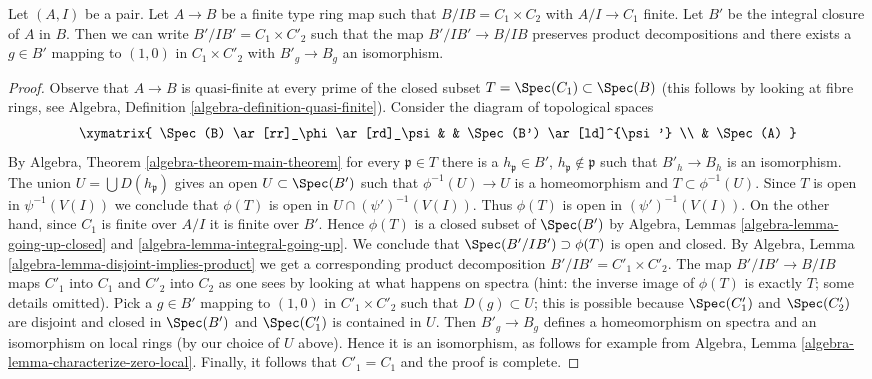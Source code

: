 \begin{lemma}
\label{lemma-helper-finite-type}
Let $(A, I)$ be a pair. Let $A \to B$ be a finite type ring map
such that $B/IB = C_1 \times C_2$ with $A/I \to C_1$ finite.
Let $B'$ be the integral closure of $A$ in $B$.
Then we can write $B'/IB' = C_1 \times C'_2$ such that
the map $B'/IB' \to B/IB$ preserves product decompositions
and there exists a $g \in B'$ mapping to $(1, 0)$ in
$C_1 \times C'_2$ with $B'_g \to B_g$ an isomorphism.
\end{lemma}

\begin{proof}
Observe that $A \to B$ is quasi-finite at every prime of the
closed subset $T = \Spec(C_1) \subset \Spec(B)$ (this follows
by looking at fibre rings, see
Algebra, Definition \ref{algebra-definition-quasi-finite}).
Consider the diagram of topological spaces
$$
\xymatrix{
\Spec(B) \ar[rr]_\phi \ar[rd]_\psi & & \Spec(B') \ar[ld]^{\psi'} \\
& \Spec(A)
}
$$
By Algebra, Theorem \ref{algebra-theorem-main-theorem}
for every $\mathfrak p \in T$ there is a $h_\mathfrak p \in B'$,
$h_\mathfrak p \not \in \mathfrak p$ such that $B'_h \to B_h$ is
an isomorphism. The union $U = \bigcup D(h_\mathfrak p)$ gives an open
$U \subset \Spec(B')$ such that $\phi^{-1}(U) \to U$ is a homeomorphism
and $T \subset \phi^{-1}(U)$. Since $T$ is open in $\psi^{-1}(V(I))$
we conclude that $\phi(T)$ is open in $U \cap (\psi')^{-1}(V(I))$.
Thus $\phi(T)$ is open in $(\psi')^{-1}(V(I))$.
On the other hand, since $C_1$ is finite over $A/I$ it is
finite over $B'$. Hence $\phi(T)$ is a closed subset of $\Spec(B')$
by Algebra, Lemmas \ref{algebra-lemma-going-up-closed} and
\ref{algebra-lemma-integral-going-up}. We conclude that
$\Spec(B'/IB') \supset \phi(T)$ is open and closed. By
Algebra, Lemma \ref{algebra-lemma-disjoint-implies-product}
we get a corresponding product decomposition $B'/IB' = C'_1 \times C'_2$.
The map $B'/IB' \to B/IB$ maps $C'_1$ into $C_1$ and $C'_2$ into $C_2$
as one sees by looking at what happens on spectra (hint: the inverse
image of $\phi(T)$ is exactly $T$; some details omitted).
Pick a $g \in B'$ mapping to $(1, 0)$ in $C'_1 \times C'_2$
such that $D(g) \subset U$; this is possible because $\Spec(C'_1)$
and $\Spec(C'_2)$ are disjoint and closed in $\Spec(B')$ and
$\Spec(C'_1)$ is contained in $U$. Then $B'_g \to B_g$ defines a homeomorphism
on spectra and an isomorphism on local rings (by our choice of $U$ above).
Hence it is an isomorphism, as follows for example from
Algebra, Lemma \ref{algebra-lemma-characterize-zero-local}.
Finally, it follows that $C'_1 = C_1$ and the proof is complete.
\end{proof}

